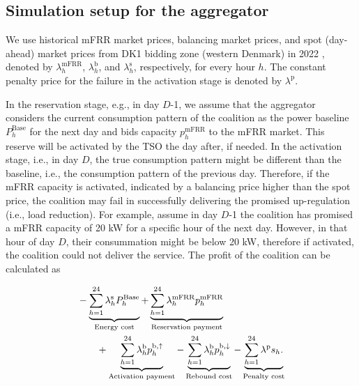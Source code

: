\documentclass[conference]{IEEEtran}
\begin{document}
\subsection{Simulation setup for the aggregator}
We use historical mFRR market prices, balancing market prices, and spot (day-ahead) market prices from DK1 bidding zone (western Denmark) in 2022 \cite{energinet:energidataservice}, denoted by $\lambda_{h}^{\text{mFRR}}$, $\lambda_{h}^{\text{b}}$, and $\lambda_{h}^{\text{s}}$, respectively, for every hour $h$. The constant penalty price for the failure in the activation stage is denoted by $\lambda^{\text{p}}$. %

In the reservation stage, e.g., in day $D$-1, we assume that the aggregator considers the current consumption pattern of the coalition as the power baseline $P^{\text{Base}}_{h}$ for the next day and bids capacity $p^{\text{mFRR}}_{h}$ to the mFRR market. This reserve will be activated by the TSO the day after, if needed. In the activation stage, i.e., in day $D$, the true consumption pattern might be different than the baseline, i.e., the consumption pattern of the previous day. Therefore, if the mFRR capacity is activated, indicated by a balancing price higher than the spot price, the coalition may fail in successfully delivering the promised up-regulation (i.e., load reduction). For example, assume in day $D$-1 the coalition has promised a mFRR capacity of 20 kW for a specific hour of the next day. However, in that hour of day $D$, their consummation might be below 20 kW, therefore if activated, the coalition could not deliver the service. The profit of the coalition can be calculated as

\begin{align}\label{eq:mFRRObjective}
     &  - \underbrace{\sum_{h=1}^{24} \lambda^{\text{s}}_{h}P^{\text{Base}}_{h}}_{\textrm{Energy cost}} + \underbrace{\sum_{h=1}^{24}\lambda_{h}^{\text{mFRR}} p^{\text{mFRR}}_{h}}_{\textrm{Reservation payment}}  \notag \\ & \quad \quad + \underbrace{\sum_{h=1}^{24}  \lambda_{h}^{\text{b}} p^{\text{b},\uparrow}_{h}}_{\textrm{Activation payment}} - \underbrace{\sum_{h=1}^{24}  \lambda_{h}^{\text{b}} p^{\text{b},\downarrow}_{h}}_{\textrm{Rebound cost}} - \underbrace{ \sum_{h=1}^{24}  \lambda^{\text{p}}s_{h}.}_{\textrm{Penalty cost}}
\end{align}
\end{document}
